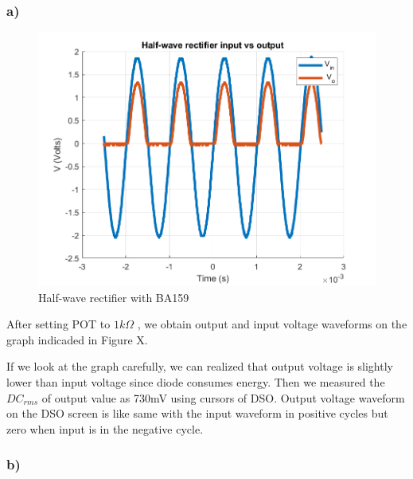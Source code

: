 \documentclass[letterpaper,12pt]{article}
\begin{document}
\subsubsection{a)}

\begin{figure}[H]
    \centering
    \includegraphics[width=1\textwidth]{2_a.png}
    \caption{Half-wave rectifier with BA159}
\end{figure} 






After setting POT to \(1k\Omega\) , we obtain output and input voltage waveforms on the graph indicaded in Figure X.


If we look at the graph carefully, we can realized that output voltage is slightly lower than input voltage since diode consumes energy. Then we measured the \(DC_{rms} \) of output value as 730mV using cursors of DSO. Output voltage waveform on the DSO screen is like same with the input waveform in positive cycles but zero when input is in the negative cycle.  


\subsubsection{b)}
\end{document}
